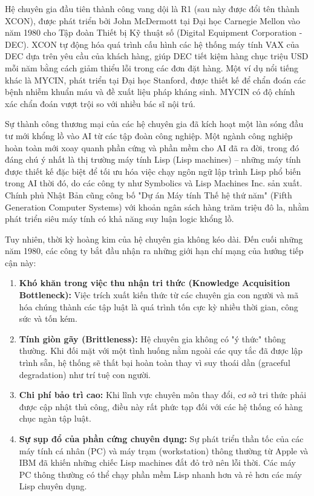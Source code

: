 Hệ chuyên gia đầu tiên thành công vang dội là R1 (sau này được đổi tên thành XCON), được phát triển bởi John McDermott tại Đại học Carnegie Mellon vào năm 1980 cho Tập đoàn Thiết bị Kỹ thuật số (Digital Equipment Corporation - DEC). XCON tự động hóa quá trình cấu hình các hệ thống máy tính VAX của DEC dựa trên yêu cầu của khách hàng, giúp DEC tiết kiệm hàng chục triệu USD mỗi năm bằng cách giảm thiểu lỗi trong các đơn đặt hàng. Một ví dụ nổi tiếng khác là MYCIN, phát triển tại Đại học Stanford, được thiết kế để chẩn đoán các bệnh nhiễm khuẩn máu và đề xuất liệu pháp kháng sinh. MYCIN có độ chính xác chẩn đoán vượt trội so với nhiều bác sĩ nội trú.

Sự thành công thương mại của các hệ chuyên gia đã kích hoạt một làn sóng đầu tư mới khổng lồ vào AI từ các tập đoàn công nghiệp. Một ngành công nghiệp hoàn toàn mới xoay quanh phần cứng và phần mềm cho AI đã ra đời, trong đó đáng chú ý nhất là thị trường máy tính Lisp (Lisp machines) – những máy tính được thiết kế đặc biệt để tối ưu hóa việc chạy ngôn ngữ lập trình Lisp phổ biến trong AI thời đó, do các công ty như Symbolics và Lisp Machines Inc. sản xuất. Chính phủ Nhật Bản cũng công bố "Dự án Máy tính Thế hệ thứ năm" (Fifth Generation Computer Systems) với khoản ngân sách hàng trăm triệu đô la, nhằm phát triển siêu máy tính có khả năng suy luận logic khổng lồ.

Tuy nhiên, thời kỳ hoàng kim của hệ chuyên gia không kéo dài. Đến cuối những năm 1980, các công ty bắt đầu nhận ra những giới hạn chí mạng của hướng tiếp cận này:
\begin{enumerate}
    \item \textbf{Khó khăn trong việc thu nhận tri thức (Knowledge Acquisition Bottleneck):} Việc trích xuất kiến thức từ các chuyên gia con người và mã hóa chúng thành các tập luật là quá trình tốn cực kỳ nhiều thời gian, công sức và tốn kém.
    \item \textbf{Tính giòn gãy (Brittleness):} Hệ chuyên gia không có "ý thức" thông thường. Khi đối mặt với một tình huống nằm ngoài các quy tắc đã được lập trình sẵn, hệ thống sẽ thất bại hoàn toàn thay vì suy thoái dần (graceful degradation) như trí tuệ con người.
    \item \textbf{Chi phí bảo trì cao:} Khi lĩnh vực chuyên môn thay đổi, cơ sở tri thức phải được cập nhật thủ công, điều này rất phức tạp đối với các hệ thống có hàng chục ngàn tập luật.
    \item \textbf{Sự sụp đổ của phần cứng chuyên dụng:} Sự phát triển thần tốc của các máy tính cá nhân (PC) và máy trạm (workstation) thông thường từ Apple và IBM đã khiến những chiếc Lisp machines đắt đỏ trở nên lỗi thời. Các máy PC thông thường có thể chạy phần mềm Lisp nhanh hơn và rẻ hơn các máy Lisp chuyên dụng.
\end{enumerate}


